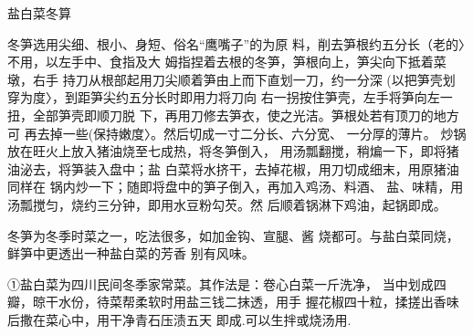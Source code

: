 \begin{recipe}{盐白菜冬算}

\ingredients


\cooking

\step 冬笋选用尖细、根小、身短、俗名“鹰嘴子”的为原 料，削去笋根约五分长（老的〉不用，以左手中、食指及大 姆指捏着去根的冬笋，笋根向上，笋尖向下抵着菜墩，右手 持刀从根部起用刀尖顺着笋由上而下直划一刀，约一分深 (以把笋壳划穿为度〉，到距笋尖约五分长时即用力将刀向
右一拐按住笋壳，左手将笋向左一扭，全部笋壳即顺刀脱 下，再用刀修去笋衣，使之光洁。笋根处若有顶刀的地方可 再去掉一些(保持嫩度〉。然后切成一寸二分长、六分宽、 一分厚的薄片。
\step 炒锅放在旺火上放入猪油烧至七成热，将冬笋倒入， 用汤瓢翻搅，稍煸一下，即将猪油泌去，将笋装入盘中；盐 白菜将水挤干，去掉花椒，用刀切成细末，用原猪油同样在 锅内炒一下；随即将盘中的笋子倒入，再加入鸡汤、料酒、 盐、味精，用汤瓢搅匀，烧约三分钟，即用水豆粉勾芡。然 后顺着锅淋下鸡油，起锅即成。

\notes

冬笋为冬季时菜之一，吃法很多，如加金钩、宣腿、酱 烧都可。与盐白菜同烧，鲜笋中更透出一种盐白菜的芳香 别有风味。

①盐白菜为四川民间冬季家常菜。其作法是：卷心白菜一斤洗净， 当中划成四瓣，晾干水份，待菜帮柔软时用盐三钱二抹透，用手 握花椒四十粒，揉搓出香味后撒在菜心中，用干净青石压渍五天 即成.可以生拌或烧汤用.

\end{recipe}

